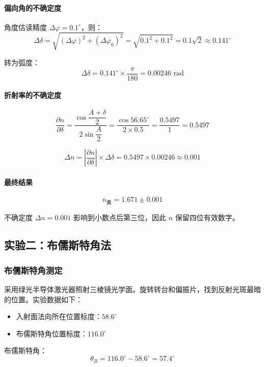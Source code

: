 \documentclass[UTF8]{article}
\begin{document}
\paragraph{偏向角的不确定度}

角度估读精度 $\Delta\varphi = 0.1^\circ$，则：
\[
\Delta\delta = \sqrt{(\Delta\varphi)^2 + (\Delta\varphi_0)^2}
= \sqrt{0.1^2 + 0.1^2}
= 0.1\sqrt{2}
\approx 0.141^\circ
\]

转为弧度：
\[
\Delta\delta = 0.141^\circ \times \frac{\pi}{180} = 0.00246 \text{ rad}
\]

\paragraph{折射率的不确定度}

\[
\frac{\partial n}{\partial \delta}
= \frac{\cos\dfrac{A+\delta}{2}}{2\sin\dfrac{A}{2}}
= \frac{\cos 56.65^\circ}{2 \times 0.5}
= \frac{0.5497}{1}
= 0.5497
\]

\[
\Delta n = \left|\frac{\partial n}{\partial \delta}\right| \times \Delta\delta
= 0.5497 \times 0.00246
\approx \boxed{0.001}
\]

\paragraph{最终结果}

\[
n_{\text{黄}} = 1.671 \pm 0.001
\]

不确定度 $\Delta n = 0.001$ 影响到小数点后第三位，因此 $n$ 保留四位有效数字。

\subsection{实验二：布儒斯特角法}

\subsubsection{布儒斯特角测定}

采用绿光半导体激光器照射三棱镜光学面。旋转转台和偏振片，找到反射光斑最暗的位置。实验数据如下：

\begin{itemize}
    \item 入射面法向所在位置标度：$58.6^\circ$
    \item 布儒斯特角位置标度：$116.0^\circ$
\end{itemize}

布儒斯特角：
\[
\theta_B = 116.0^\circ - 58.6^\circ = 57.4^\circ
\]
\end{document}
